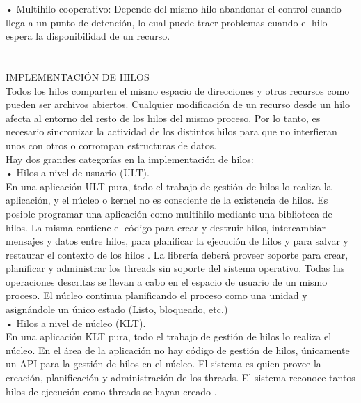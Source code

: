 \documentclass[conference]{IEEEtran}
\begin{document}
• Multihilo cooperativo: Depende del mismo hilo abandonar el control cuando llega a un punto de detención, lo cual puede traer problemas cuando el hilo espera la disponibilidad de un recurso.
\\
\\
\\
IMPLEMENTACIÓN DE HILOS
\\
Todos los hilos comparten el mismo espacio de direcciones y otros recursos como pueden ser archivos abiertos. Cualquier modificación de un recurso desde un hilo afecta al entorno del resto de los hilos del mismo proceso. Por lo tanto, es necesario sincronizar la actividad de los distintos hilos para que no interfieran unos con otros o corrompan estructuras de datos.
\\
Hay dos grandes categorías en la implementación de hilos:
\\
•	Hilos a nivel de usuario (ULT).
\\
En una aplicación ULT pura, todo el trabajo de gestión de hilos lo realiza la aplicación, y el núcleo o kernel no es consciente de la existencia de hilos. Es posible programar una aplicación como multihilo mediante una biblioteca de hilos. La misma contiene el código para crear y destruir hilos, intercambiar mensajes y datos entre hilos, para planificar la ejecución de hilos y para salvar y restaurar el contexto de los hilos \cite{b4}. La librería deberá proveer soporte para crear, planificar y administrar los threads sin soporte del sistema operativo. 
Todas las operaciones descritas se llevan a cabo en el espacio de usuario de un mismo proceso. El núcleo continua planificando el proceso como una unidad y asignándole un único estado (Listo, bloqueado, etc.)
\\
•	Hilos a nivel de núcleo (KLT).
\\
En una aplicación KLT pura, todo el trabajo de gestión de hilos lo realiza el núcleo. En el área de la aplicación no hay código de gestión de hilos, únicamente un API para la gestión de hilos en el núcleo. El sistema es quien provee la creación, planificación y administración de los threads. El sistema reconoce tantos hilos de ejecución como threads se hayan creado \cite{b5}.
\\
\\
\end{document}
